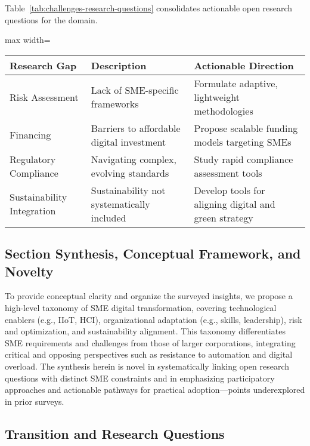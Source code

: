 \documentclass[sigconf]{acmart}
\begin{document}
Table~\ref{tab:challenges-research-questions} consolidates actionable open research questions for the domain.

\begin{table*}[htbp]
\centering
\caption{Open Research Questions in SME Digital Transformation: Challenges and Strategies}
\label{tab:challenges-research-questions}
\begin{adjustbox}{max width=\textwidth}
\begin{tabular}{@{}lll@{}}
\toprule
Research Gap & Description & Actionable Direction \\
\midrule
Risk Assessment & Lack of SME-specific frameworks & Formulate adaptive, lightweight methodologies \\
Financing & Barriers to affordable digital investment & Propose scalable funding models targeting SMEs \\
Regulatory Compliance & Navigating complex, evolving standards & Study rapid compliance assessment tools \\
Sustainability Integration & Sustainability not systematically included & Develop tools for aligning digital and green strategy \\
\bottomrule
\end{tabular}
\end{adjustbox}
\end{table*}

\subsection{Section Synthesis, Conceptual Framework, and Novelty}

To provide conceptual clarity and organize the surveyed insights, we propose a high-level taxonomy of SME digital transformation, covering technological enablers (e.g., IIoT, HCI), organizational adaptation (e.g., skills, leadership), risk and optimization, and sustainability alignment. This taxonomy differentiates SME requirements and challenges from those of larger corporations, integrating critical and opposing perspectives such as resistance to automation and digital overload. The synthesis herein is novel in systematically linking open research questions with distinct SME constraints and in emphasizing participatory approaches and actionable pathways for practical adoption—points underexplored in prior surveys.

\subsection{Transition and Research Questions}
\end{document}
